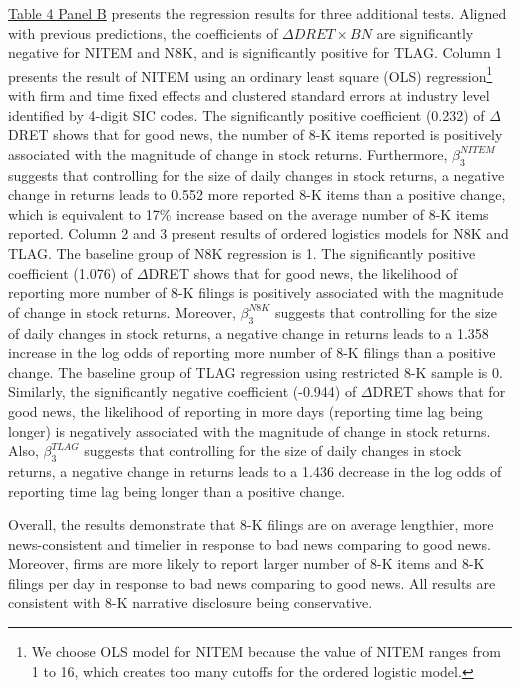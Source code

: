\documentclass[a4paper]{article}
\begin{document}
\begin{spacing}{2}
\hyperref[T4PB]{Table 4 Panel B} presents the regression results for three additional tests. Aligned with previous predictions, the coefficients of $\Delta DRET\times BN$ are significantly negative for NITEM and N8K, and is significantly positive for TLAG. Column 1 presents the result of NITEM using an ordinary least square (OLS) regression\footnote{We choose OLS model for NITEM because the value of NITEM ranges from 1 to 16, which creates too many cutoffs for the ordered logistic model.} with firm and time fixed effects and clustered standard errors at industry level identified by 4-digit SIC codes. The significantly positive coefficient (0.232) of $\Delta$DRET shows that for good news, the number of 8-K items reported is positively associated with the magnitude of change in stock returns. Furthermore, $\beta_3^{NITEM}$ suggests that controlling for the size of daily changes in stock returns, a negative change in returns leads to 0.552 more reported 8-K items than a positive change, which is equivalent to 17\% increase based on the average number of 8-K items reported. Column 2 and 3 present results of ordered logistics models for N8K and TLAG. The baseline group of N8K regression is 1. The significantly positive coefficient (1.076) of $\Delta$DRET shows that for good news, the likelihood of reporting more number of 8-K filings is positively associated with the magnitude of change in stock returns. Moreover, $\beta_3^{N8K}$ suggests that controlling for the size of daily changes in stock returns, a negative change in returns leads to a 1.358 increase in the log odds of reporting more number of 8-K filings than a positive change. The baseline group of TLAG regression using restricted 8-K sample is 0. Similarly, the significantly negative coefficient (-0.944) of $\Delta$DRET shows that for good news, the likelihood of reporting in more days (reporting time lag being longer) is negatively associated with the magnitude of change in stock returns. Also, $\beta_3^{TLAG}$ suggests that controlling for the size of daily changes in stock returns, a negative change in returns leads to a 1.436 decrease in the log odds of reporting time lag being longer than a positive change. 

Overall, the results demonstrate that 8-K filings are on average lengthier, more news-consistent and timelier in response to bad news comparing to good news. Moreover, firms are more likely to report larger number of 8-K items and 8-K filings per day in response to bad news comparing to good news. All results are consistent with 8-K narrative disclosure being conservative.


\end{spacing}
\end{document}
